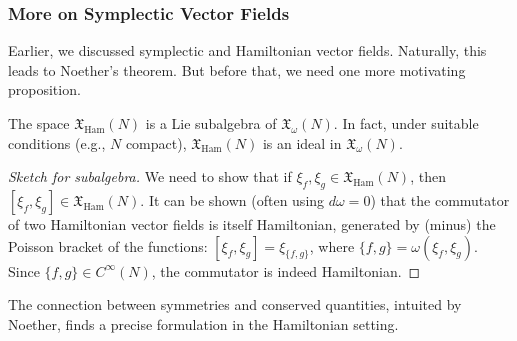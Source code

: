 \subsubsection{More on Symplectic Vector Fields}

Earlier, we discussed symplectic and Hamiltonian vector fields. Naturally, this leads to Noether's theorem. But before that, we need one more motivating proposition.

\begin{proposition}
The space $\mathfrak{X}_{\mathrm{Ham}}(N)$ is a Lie subalgebra of $\mathfrak{X}_{\omega}(N)$. In fact, under suitable conditions (e.g., $N$ compact), $\mathfrak{X}_{\mathrm{Ham}}(N)$ is an ideal in $\mathfrak{X}_{\omega}(N)$.
\end{proposition}
\begin{proof}[Sketch for subalgebra]
We need to show that if $\xi_f, \xi_g \in \mathfrak{X}_{\mathrm{Ham}}(N)$, then $[\xi_f, \xi_g] \in \mathfrak{X}_{\mathrm{Ham}}(N)$. It can be shown (often using $d\omega=0$) that the commutator of two Hamiltonian vector fields is itself Hamiltonian, generated by (minus) the Poisson bracket of the functions: $[\xi_f, \xi_g] = \xi_{\{f, g\}}$, where $\{f,g\} = \omega(\xi_f, \xi_g)$. Since $\{f,g\} \in C^\infty(N)$, the commutator is indeed Hamiltonian.
\end{proof}

The connection between symmetries and conserved quantities, intuited by Noether, finds a precise formulation in the Hamiltonian setting.

